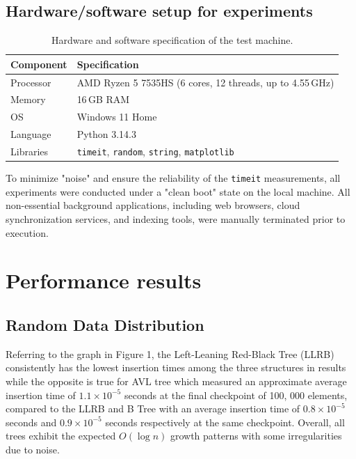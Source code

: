 \documentclass[12pt]{article}
\begin{document}
\subsection{Hardware/software setup for experiments}
\begin{table}[H]
    \centering
    \begin{tabular}{|l|l|}
        \hline
        \textbf{Component} & \textbf{Specification} \\
        \hline
        Processor & AMD Ryzen 5 7535HS (6 cores, 12 threads, up to 4.55\,GHz) \\
        Memory    & 16\,GB RAM \\
        OS        & Windows 11 Home \\
        Language  & Python 3.14.3 \\
        Libraries & \texttt{timeit}, \texttt{random}, \texttt{string}, \texttt{matplotlib} \\
        \hline
    \end{tabular}
    \caption{Hardware and software specification of the test machine.}
    \label{tab:hw_sw}
\end{table}

To minimize "noise" and ensure the reliability of the \texttt{timeit} measurements, all experiments were conducted under a "clean boot" state on the local machine. All non-essential background applications, including web browsers, cloud synchronization services, and indexing tools, were manually terminated prior to execution.



\section{Performance results}


\subsection{Random Data Distribution}
Referring to the graph in Figure 1, the Left-Leaning Red-Black Tree (LLRB) consistently has the lowest insertion times among the three structures in results while the opposite is true for AVL tree which measured an approximate average insertion time of $1.1 \times 10^{-5}$ seconds at the final checkpoint of 100, 000 elements, compared to the LLRB and B Tree with an average insertion time of $0.8 \times 10^{-5}$ seconds and $0.9 \times 10^{-5}$ seconds respectively at the same checkpoint. Overall, all trees exhibit the expected $O (\log n)$ growth patterns with some irregularities due to noise.
\end{document}
